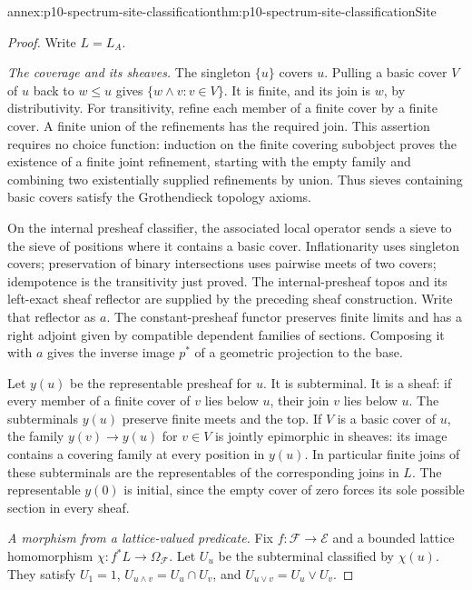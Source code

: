 \begin{annexitem}{annex:p10-spectrum-site-classification}{thm:p10-spectrum-site-classification}{Site}
\begin{proof}
Write \(L=L_A\).

\emph{The coverage and its sheaves.}
The singleton \(\{u\}\) covers \(u\).
Pulling a basic cover \(V\) of \(u\) back to \(w\leq u\)
gives \(\{w\wedge v:v\in V\}\).
It is finite, and its join is \(w\), by distributivity.
For transitivity, refine each member of a finite cover by a
finite cover. A finite union of the refinements has the required
join. This assertion requires no choice function:
induction on the finite covering subobject proves the existence
of a finite joint refinement, starting with the empty family
and combining two existentially supplied refinements by union.
Thus sieves containing basic covers satisfy the Grothendieck
topology axioms.

On the internal presheaf classifier, the associated local operator
sends a sieve to the sieve of positions where it contains a basic
cover. Inflationarity uses singleton covers; preservation of binary
intersections uses pairwise meets of two covers; idempotence is
the transitivity just proved. The internal-presheaf topos and its
left-exact sheaf reflector are supplied by the preceding sheaf
construction. Write that reflector as \(a\).
The constant-presheaf functor preserves finite limits and has
a right adjoint given by compatible dependent families of sections.
Composing it with \(a\) gives the inverse image \(p^*\) of
a geometric projection to the base.

Let \(y(u)\) be the representable presheaf for \(u\).
It is subterminal. It is a sheaf: if every member of a finite
cover of \(v\) lies below \(u\), their join \(v\) lies below \(u\).
The subterminals \(y(u)\) preserve finite meets and the top.
If \(V\) is a basic cover of \(u\), the family \(y(v)\to y(u)\)
for \(v\in V\) is jointly epimorphic in sheaves: its image
contains a covering family at every position in \(y(u)\).
In particular finite joins of these subterminals are the
representables of the corresponding joins in \(L\).
The representable \(y(0)\) is initial, since the empty cover
of zero forces its sole possible section in every sheaf.

\emph{A morphism from a lattice-valued predicate.}
Fix \(f:\mathcal F\to\mathcal E\) and a bounded lattice
homomorphism \(\chi:f^*L\to\Omega_{\mathcal F}\).
Let \(U_u\) be the subterminal classified by \(\chi(u)\).
They satisfy \(U_1=1\), \(U_{u\wedge v}=U_u\cap U_v\),
and \(U_{u\vee v}=U_u\vee U_v\).


\end{proof}
\end{annexitem}
